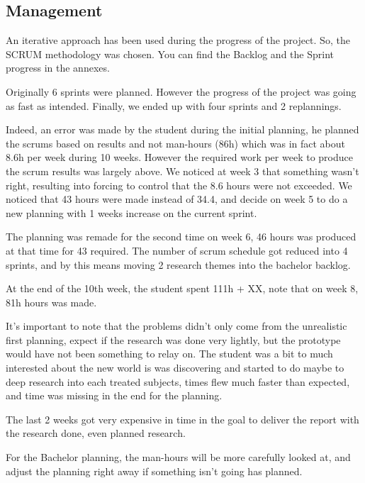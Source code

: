 
\subsection{Management}
An iterative approach has been used during the progress of the project. So, the SCRUM methodology was chosen. You can find the Backlog and the Sprint progress in the annexes.

Originally 6 sprints were planned. However the progress of the project was going as fast as intended. Finally, we ended up with four sprints and 2 replannings.

Indeed, an error was made by the student during the initial planning, he planned the scrums based on results and not man-hours (86h) which was in fact about 8.6h per week during 10 weeks. However the required work per week to produce the scrum results was largely above. We noticed at week 3 that something wasn't right, resulting into forcing to control that the 8.6 hours were not exceeded. We noticed that 43 hours were made instead of 34.4, and decide on week 5 to do a new planning with 1 weeks increase on the current sprint.

The planning was remade for the second time on week 6, 46 hours was produced at that time for 43 required. The number of scrum schedule got reduced into 4 sprints, and by this means moving 2 research themes into the bachelor backlog.

At the end of the 10th week, the student spent 111h + XX, note that on week 8, 81h hours was made.

It's important to note that the problems didn't only come from the unrealistic first planning, expect if the research was done very lightly, but the prototype would have not been something to relay on. The student was a bit to much interested about the new world is was discovering and started to do maybe to deep research into each treated subjects, times flew much faster than expected, and time was missing in the end for the planning.

The last 2 weeks got very expensive in time in the goal to deliver the report with the research done, even planned research.

For the Bachelor planning, the man-hours will be more carefully looked at, and adjust the planning right away if something isn't going has planned.

